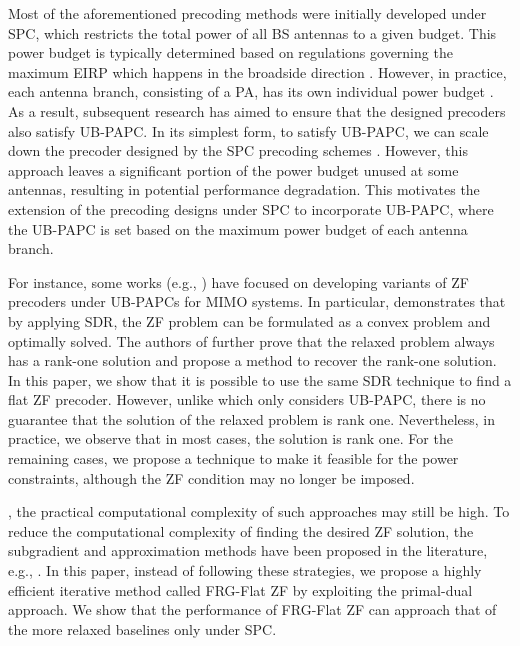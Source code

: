 Most of the aforementioned precoding methods were initially developed under SPC, which restricts the total power of all BS antennas to a given budget. This power budget is typically determined based on regulations governing the maximum EIRP which happens in the broadside direction \cite{Kim2012Globe}. However, in practice, each antenna branch, consisting of a PA, has its own individual power budget \cite{Zheng2007PAPC,Victor2019PA}. As a result, subsequent research has aimed to ensure that the designed precoders also satisfy UB-PAPC. In its simplest form, to satisfy UB-PAPC, we can scale down the precoder designed by the SPC precoding schemes \cite{Lee2013Scale}. However, this approach leaves a significant portion of the power budget unused at some antennas, resulting in potential performance degradation. This motivates the extension of the precoding designs under SPC to incorporate UB-PAPC, where the UB-PAPC is set based on the maximum power budget of each antenna branch.


For instance, some works (e.g., \cite{Wisel2008, Rui2010, Pham2018}) have focused on developing variants of ZF precoders under UB-PAPCs for MIMO systems. In particular, \cite{Wisel2008} demonstrates that by applying SDR, the ZF problem can be formulated as a convex problem and optimally solved. The authors of \cite{Wisel2008} further prove that the relaxed problem always has a rank-one solution and propose a method to recover the rank-one solution. In this paper, we show that it is possible to use the same SDR technique to find a flat ZF precoder. However, unlike \cite{Wisel2008} which only considers UB-PAPC, there is no guarantee that the solution of the relaxed problem is rank one. Nevertheless, in practice, we observe that in most cases, the solution is rank one. For the remaining cases, we propose a technique to make it feasible for the power constraints, although the ZF condition may no longer be imposed.

, the practical computational complexity of such approaches may still be high. To reduce the computational complexity of finding the desired ZF solution, the subgradient and approximation methods have been proposed in the literature, e.g., \cite{Rui2010, Pham2018}. In this paper, instead of following these strategies, we propose a highly efficient iterative method called FRG-Flat ZF by exploiting the primal-dual approach. We show that the performance of FRG-Flat ZF can approach that of the more relaxed baselines only under SPC.

